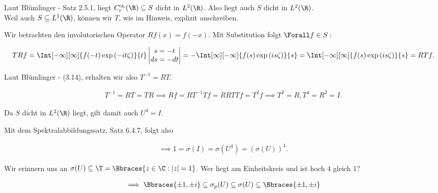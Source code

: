 \begin{solution}

Laut Blümlinger - Satz 2.5.1, liegt $C_c^\infty(\R) \subseteq S$ dicht in $L^2(\R)$.
Also liegt auch $S$ dicht in $L^2(\R)$. \\

Weil auch $S \subseteq L^1(\R)$, können wir $T$, wie im Hinweis, explizit anschreiben. \\


Wir betrachten den involutorischen Operator $R f(x) = f(-x)$.
Mit Substitution folgt $\Forall f \in S:$

\begin{align*}
  T R f
  =
  \Int[-\infty][\infty]
  {f(-t) \exp{(-i t \zeta)}}{t}
  \begin{vmatrix}
    s = -t \\
    ds = -dt
  \end{vmatrix}
  =
  -\Int[\infty][-\infty]{f(s) \exp{(i s \zeta)}}{s}
  =
  \Int[-\infty][\infty]{f(s) \exp{(i s \zeta)}}{s}
  =
  R T f.
\end{align*}

Laut Blümlinger - (3.14), erhalten wir also $T^{-1} = R T$.

\begin{align*}
  T^{-1} = R T = T R
  \implies
  R f = R T^{-1} T f = R R T T f = T^2 f
  \implies
  T^2 = R, T^4 = R^2 = I.
\end{align*}

Da $S$ dicht in $L^2(\R)$ liegt, gilt damit auch $U^4 = I$.


Mit dem Spektralabbildungssatz, Satz 6.4.7, folgt also

\begin{align*}
  \implies
  1 = \sigma(I) = \sigma(U^4) = (\sigma(U))^4.
\end{align*}

Wir erinnern uns an $\sigma(U) \subseteq \T = \Bbraces{z \in \C: |z| = 1}$.
Wer liegt am Einheitskreis und ist hoch $4$ gleich $1$?

\begin{align*}
  \implies
  \Bbraces{\pm 1, \pm i}
  \subseteq
  \sigma_p(U)
  \subseteq
  \sigma(U)
  \subseteq
  \Bbraces{\pm 1, \pm i}
\end{align*}

\end{solution}
